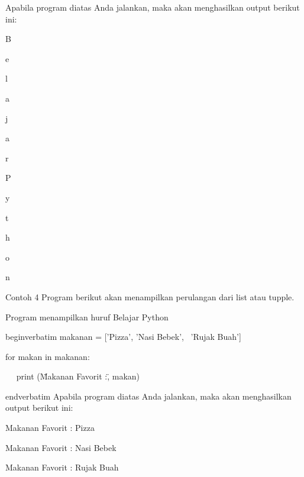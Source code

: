 Apabila program diatas Anda jalankan, maka akan menghasilkan output berikut ini:\vspace{\baselineskip}
\vspace{\baselineskip}
 \par
B \par
e \par
l \par
a \par
j \par
a \par
r \par
  \par
P \par
y \par
t \par
h \par
o \par
n \par
\vspace{12pt}
Contoh 4\vspace{\baselineskip}
\vspace{\baselineskip}
Program berikut akan menampilkan perulangan dari list atau tupple.\vspace{\baselineskip}
\vspace{\baselineskip}
 \par
Program menampilkan huruf Belajar Python \par
\vspace{12pt}
begin{verbatim}
makanan = ['Pizza', 'Nasi Bebek',~ 'Rujak Buah'] \par
for makan in makanan: \par
~~ print (\"Makanan Favorit :\", makan) \par
end{verbatim}
\vspace{12pt}
Apabila program diatas Anda jalankan, maka akan menghasilkan output berikut ini:\vspace{\baselineskip}
\vspace{\baselineskip}
 \par
Makanan Favorit : Pizza \par
Makanan Favorit : Nasi Bebek \par
Makanan Favorit : Rujak Buah \par
\vspace{12pt}
\vspace{\baselineskip}
\vspace{12pt}
